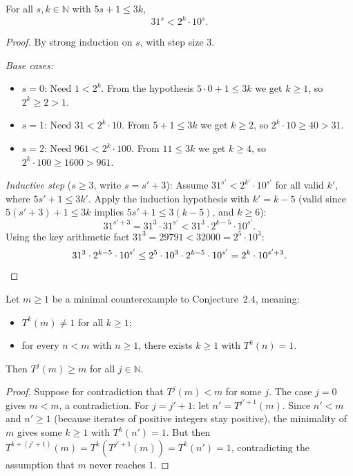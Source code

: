 \begin{lemma}\label{lemma:ratio_bound}\leanok
For all $s, k \in \mathbb{N}$ with $5s + 1 \le 3k$,
\[
  31^s < 2^k \cdot 10^s.
\]
\end{lemma}
\begin{proof}\leanok
By strong induction on $s$, with step size $3$.

\emph{Base cases:}
\begin{itemize}
  \item $s = 0$: Need $1 < 2^k$. From the hypothesis $5 \cdot 0 + 1 \le 3k$ we get $k \ge 1$, so $2^k \ge 2 > 1$. \checkmark
  \item $s = 1$: Need $31 < 2^k \cdot 10$. From $5 + 1 \le 3k$ we get $k \ge 2$, so $2^k \cdot 10 \ge 40 > 31$. \checkmark
  \item $s = 2$: Need $961 < 2^k \cdot 100$. From $11 \le 3k$ we get $k \ge 4$, so $2^k \cdot 100 \ge 1600 > 961$. \checkmark
\end{itemize}

\emph{Inductive step} ($s \ge 3$, write $s = s' + 3$): Assume $31^{s'} < 2^{k'} \cdot 10^{s'}$ for all valid $k'$, where $5s' + 1 \le 3k'$.
Apply the induction hypothesis with $k' = k - 5$ (valid since $5(s'+3)+1 \le 3k$ implies $5s'+1 \le 3(k-5)$, and $k \ge 6$):
\[
  31^{s'+3} = 31^3 \cdot 31^{s'} < 31^3 \cdot 2^{k-5} \cdot 10^{s'}.
\]
Using the key arithmetic fact $31^3 = 29791 < 32000 = 2^5 \cdot 10^3$:
\[
  31^3 \cdot 2^{k-5} \cdot 10^{s'}
  \le 2^5 \cdot 10^3 \cdot 2^{k-5} \cdot 10^{s'}
  = 2^k \cdot 10^{s'+3}. \qedhere
\]
\end{proof}

\begin{lemma}\label{lemma:orbit_lower_bound}\leanok
Let $m \ge 1$ be a minimal counterexample to Conjecture~2.4, meaning:
\begin{itemize}
  \item $T^k(m) \ne 1$ for all $k \ge 1$;
  \item for every $n < m$ with $n \ge 1$, there exists $k \ge 1$ with $T^k(n) = 1$.
\end{itemize}
Then $T^j(m) \ge m$ for all $j \in \mathbb{N}$.
\end{lemma}
\begin{proof}\leanok
Suppose for contradiction that $T^j(m) < m$ for some $j$.
The case $j = 0$ gives $m < m$, a contradiction.
For $j = j' + 1$: let $n' = T^{j'+1}(m)$. Since $n' < m$ and $n' \ge 1$ (because iterates of positive integers stay positive), the minimality of $m$ gives some $k \ge 1$ with $T^k(n') = 1$.
But then $T^{k + (j'+1)}(m) = T^k(T^{j'+1}(m)) = T^k(n') = 1$, contradicting the assumption that $m$ never reaches $1$.
\end{proof}

